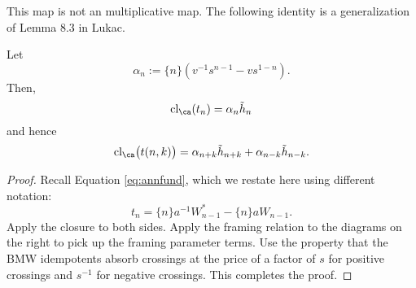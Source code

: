 
This map is not an multiplicative map. The following identity is a generalization of Lemma 8.3 in Lukac. 

\begin{lemma} \label{lemma:tclosure}
Let 
\[
\alpha_n := \{ n \} \left( v^{-1} s^{n - 1} - v s^{1 - n} \right).
\] 
Then, 
\[
\textrm{cl}_\ca (t_n) = \alpha_n \tilde{h}_n
\]
and hence 
\[
\textrm{cl}_\ca \big( t(n, k) \big) = \alpha_{n+k} \tilde{h}_{n+k} + \alpha_{n-k} \tilde{h}_{n-k}.
\]
\end{lemma}
\begin{proof}
Recall Equation \eqref{eq:annfund}, which we restate here using different notation:
\[
t_n = \{ n \} a^{-1}W^*_{n - 1} - \{ n \} aW_{n - 1}.
\]
Apply the closure to both sides. Apply the framing relation to the diagrams on the right to pick up the framing parameter terms. Use the property that the BMW idempotents absorb crossings at the price of a factor of $s$ for positive crossings and $s^{-1}$ for negative crossings. This completes the proof. 
\end{proof}

